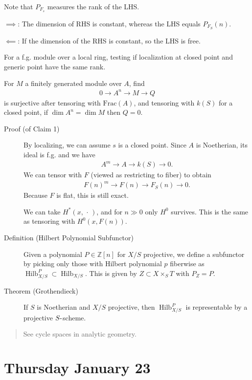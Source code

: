 Note that \(P_{F_s}\) measures the rank of the LHS.

\(\implies\): The dimension of RHS is constant, whereas the LHS equals
\(P_{F_S}(n)\).

\(\impliedby\): If the dimension of the RHS is constant, so the LHS is
free.

For a f.g. module over a local ring, testing if localization at closed
point and generic point have the same rank.

For \(M\) a finitely generated module over \(A\), find
\begin{align*}
0 \to A^n \to M \to Q
\end{align*}
is surjective after tensoring with \(\mathrm{Frac}(A)\), and tensoring
with \(k(S)\) for a closed point, if \(\dim A^n = \dim M\) then
\(Q = 0\).

\begin{description}
\item[Proof (of Claim 1)]
By localizing, we can assume \(s\) is a closed point. Since \(A\) is
Noetherian, its ideal is f.g. and we have
\begin{align*}
A^m \to A \to k(S) \to 0
.\end{align*}
We can tensor with \(F\) (viewed as restricting to fiber) to obtain
\begin{align*}
F(n)^m \to F(n) \to F_S(n) \to 0
.\end{align*}
Because \(F\) is flat, this is still exact.

\hfill\break

We can take \(H^*(x, {\,\cdot\,})\), and for \(n\gg 0\) only \(H^0\)
survives. This is the same as tensoring with \(H^0(x, F(n))\).
\item[Definition (Hilbert Polynomial Subfunctor)]
Given a polynomial \(P \in {\mathbb{Z}}[n]\) for \(X/S\) projective, we
define a subfunctor by picking only those with Hilbert polynomial \(p\)
fiberwise as
\(\operatorname{Hilb}^P_{X/S} \subset \operatorname{Hilb}_{X/S}\). This
is given by \(Z \subset X \times_S T\) with \(P_{Z} = P\).
\item[Theorem (Grothendieck)]
If \(S\) is Noetherian and \(X/S\) projective, then
\(\operatorname{Hilb}_{X/S}^P\) is representable by a projective
\(S{\hbox{-}}\)scheme.
\end{description}

\begin{quote}
See cycle spaces in analytic geometry.
\end{quote}

\hypertarget{thursday-january-23}{%
\section{Thursday January 23}\label{thursday-january-23}}

